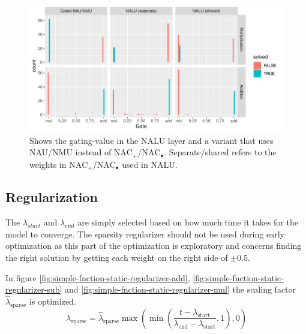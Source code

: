 \begin{figure}[h]
\centering
\includegraphics[width=0.93\linewidth]{results/function_task_static_nalu.pdf}
\vspace{-0.2cm}\caption{Shows the gating-value in the NALU layer and a variant that uses NAU/NMU instead of $\mathrm{NAC}_{+}$/$\mathrm{NAC}_{\bullet}$. Separate/shared refers to the weights in $\mathrm{NAC}_{+}$/$\mathrm{NAC}_{\bullet}$ used in NALU.}
\label{fig:simple-function-static-nalu-gate-graph}
\end{figure}



\subsection{Regularization}
\label{sec:appendix:simple-function-task:regualization}

The $\lambda_{start}$ and $\lambda_{end}$ are simply selected based on how much time it takes for the model to converge. The sparsity regularizer should not be used during early optimization as this part of the optimization is exploratory and concerns finding the right solution by getting each weight on the right side of $\pm 0.5$.

In figure \ref{fig:simple-fnction-static-regularizer-add}, \ref{fig:simple-fnction-static-regularizer-sub} and \ref{fig:simple-fnction-static-regularizer-mul} the scaling factor $\hat{\lambda}_{\mathrm{sparse}}$ is optimized.
\begin{equation}
\lambda_{\mathrm{sparse}} = \hat{\lambda}_{\mathrm{sparse}} \max(\min(\frac{t - \lambda_{\mathrm{start}}}{\lambda_{\mathrm{end}} - \lambda_{\mathrm{start}}}, 1), 0)
\end{equation}

